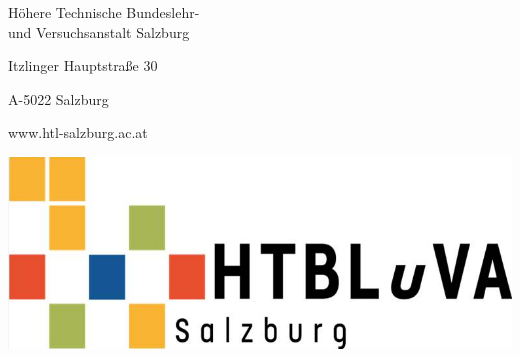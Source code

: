 \begin{minipage}{0.49\textwidth}
Höhere Technische Bundeslehr-\\
und Versuchsanstalt Salzburg \par \medskip 
Itzlinger Hauptstraße 30 \par \medskip 
A-5022 Salzburg \par \medskip 
www.htl-salzburg.ac.at
\end{minipage}
\begin{minipage}{0.49\textwidth} \hspace*{\fill}
{\includegraphics[scale=0.25]{Illustrations/HTL_logo.png}} \hspace{\fill}
\end{minipage}
\newpage
\clearpage
\thispagestyle{empty}
\mbox{}
\newpage